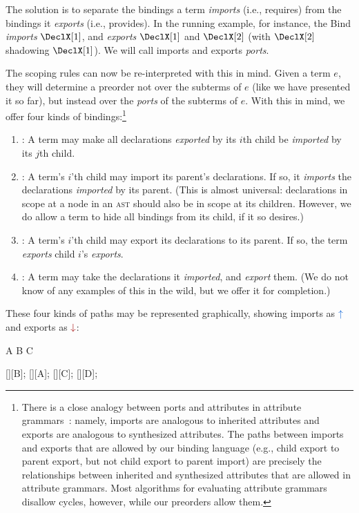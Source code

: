 The solution is to separate the bindings a term \emph{imports} (i.e.,
requires) from the bindings it \emph{exports} (i.e., provides). In the
running example, for instance, the Bind \emph{imports} $\DeclX[1]$,
and \emph{exports} $\DeclX[1]$ and $\DeclX[2]$ (with $\DeclX[2]$
shadowing $\DeclX[1]$). We will call imports and exports \emph{ports}.

The scoping rules can now be re-interpreted with this in mind. Given a
term $e$, they will determine a preorder not over the subterms of $e$
(like we have presented it so far), but instead over the \emph{ports}
of the subterms of $e$. With this in mind, we offer four kinds of bindings:\footnote{
  There is a close analogy between ports and attributes in attribute
  grammars~\cite{knuth-attribute-grammar}:
  namely, imports are analogous to inherited
  attributes and exports are analogous to synthesized attributes.
  The paths between imports and exports that are allowed by our
  binding language (e.g., child export to parent export, but not
  child export to parent import) are precisely the relationships
  between inherited and synthesized attributes that are allowed in
  attribute grammars. Most algorithms for evaluating attribute
  grammars disallow cycles, however, while our preorders allow them.
}
\begin{enumerate}
\item[A.] : A term may make all declarations
  \emph{exported} by its $i$th child be \emph{imported} by its $j$th child.
\item[B.] : A term's $i$'th child may import its
  parent's declarations. If so, it \emph{imports} the declarations \emph{imported}
  by its parent. (This is almost universal:
  declarations in scope at a node in an \textsc{ast} should
  also be in scope at its children. However, we do allow a term to
  hide all bindings from its child, if it so desires.)
\item[C.] : A term's $i$'th child may export its
  declarations to its parent. If so, the term \emph{exports} child $i$'s
  \emph{exports}.
\item[D.] \SpecSelf: A term may take the declarations it
  \emph{imported}, and \emph{export} them. (We do not know of any
  examples of this in the wild, but we offer it for completion.)
\end{enumerate}
These four kinds of paths may be represented graphically,
showing imports as $\ImSymbCirc$ and exports as $\ExSymbCirc$:

\begin{center}
\begin{tikzScopeDiagram}
  \tikzRoot
    {A}{
      {B}{}
      {C}{}}
  \begin{tikzEdges}
    [][B];
    [][A];
    [][C];
    [][D];
  \end{tikzEdges}
\end{tikzScopeDiagram}
\end{center}


